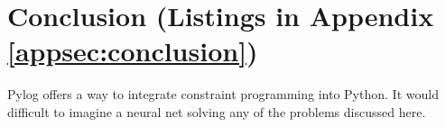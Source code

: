 \section{Conclusion (Listings in Appendix \ref{appsec:conclusion})} \label{sec:conclusion}



Pylog offers a way to integrate constraint programming into Python. It would difficult to imagine a neural net solving any of the problems discussed here.






